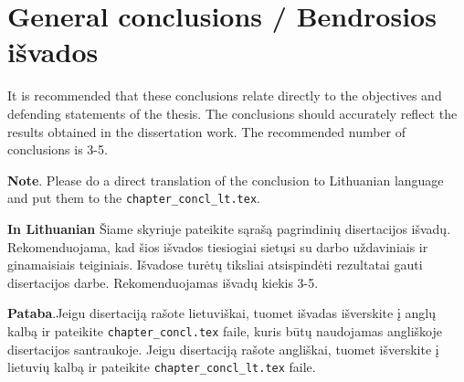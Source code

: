 \chapter*{General conclusions / Bendrosios išvados }
\label{cha:concl}

It is recommended that these conclusions relate directly to the objectives and defending statements of the thesis. 
The conclusions should accurately reflect the results obtained in the dissertation work.
The recommended number of conclusions is 3-5.

\textbf{Note}. Please do a direct translation of the conclusion to Lithuanian language and put them to the \verb|chapter_concl_lt.tex|.


\textbf{In Lithuanian} Šiame skyriuje pateikite sąrašą pagrindinių disertacijos išvadų. Rekomenduojama, kad šios išvados tiesiogiai sietųsi su darbo uždaviniais ir ginamaisiais teiginiais. Išvadose turėtų tiksliai atsispindėti rezultatai gauti disertacijos darbe. 
Rekomenduojamas išvadų kiekis 3-5.

\textbf{Pataba}.Jeigu disertaciją rašote lietuviškai, tuomet išvadas išverskite į anglų kalbą ir pateikite \verb|chapter_concl.tex| faile, kuris būtų naudojamas angliškoje disertacijos santraukoje.
Jeigu disertaciją rašote angliškai, tuomet išverskite į lietuvių kalbą ir pateikite \verb|chapter_concl_lt.tex| faile.
